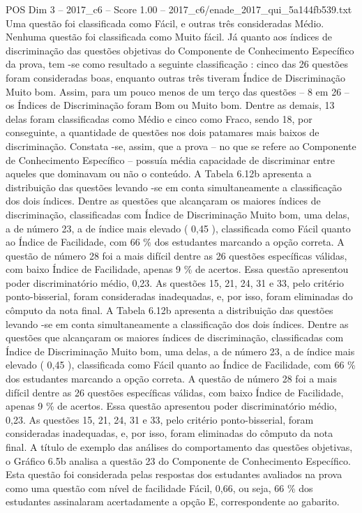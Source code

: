 \begin{textsample}{POS Dim 3 – 2017\_c6 – Score 1.00 – 2017\_c6/enade\_2017\_qui\_5a144fb539.txt}
Uma questão foi classificada como Fácil, e outras três consideradas Médio.
Nenhuma questão foi classificada como Muito fácil.
Já quanto aos índices de discriminação das questões objetivas do Componente de Conhecimento Específico da prova, tem -se como resultado a seguinte classificação : cinco das 26 questões foram consideradas boas, enquanto outras três tiveram Índice de Discriminação Muito bom.
Assim, para um pouco menos de um terço das questões – 8 em 26 – os Índices de Discriminação foram Bom ou Muito bom.
Dentre as demais, 13 delas foram classificadas como Médio e cinco como Fraco, sendo 18, por conseguinte, a quantidade de questões nos dois patamares mais baixos de discriminação.
Constata -se, assim, que a prova – no que se refere ao Componente de Conhecimento Específico – possuía média capacidade de discriminar entre aqueles que dominavam ou não o conteúdo.
A Tabela 6.12b apresenta a distribuição das questões levando -se em conta simultaneamente a classificação dos dois índices.
Dentre as questões que alcançaram os maiores índices de discriminação, classificadas com Índice de Discriminação Muito bom, uma delas, a de número 23, a de índice mais elevado ( 0,45 ), classificada como Fácil quanto ao Índice de Facilidade, com 66 \% dos estudantes marcando a opção correta.
A questão de número 28 foi a mais difícil dentre as 26 questões específicas válidas, com baixo Índice de Facilidade, apenas 9 \% de acertos.
Essa questão apresentou poder discriminatório médio, 0,23.
As questões 15, 21, 24, 31 e 33, pelo critério ponto-bisserial, foram consideradas inadequadas, e, por isso, foram eliminadas do cômputo da nota final.
A Tabela 6.12b apresenta a distribuição das questões levando -se em conta simultaneamente a classificação dos dois índices.
Dentre as questões que alcançaram os maiores índices de discriminação, classificadas com Índice de Discriminação Muito bom, uma delas, a de número 23, a de índice mais elevado ( 0,45 ), classificada como Fácil quanto ao Índice de Facilidade, com 66 \% dos estudantes marcando a opção correta.
A questão de número 28 foi a mais difícil dentre as 26 questões específicas válidas, com baixo Índice de Facilidade, apenas 9 \% de acertos.
Essa questão apresentou poder discriminatório médio, 0,23.
As questões 15, 21, 24, 31 e 33, pelo critério ponto-bisserial, foram consideradas inadequadas, e, por isso, foram eliminadas do cômputo da nota final.
A título de exemplo das análises do comportamento das questões objetivas, o Gráfico 6.5b analisa a questão 23 do Componente de Conhecimento Específico.
Esta questão foi considerada pelas respostas dos estudantes avaliados na prova como uma questão com nível de facilidade Fácil, 0,66, ou seja, 66 \% dos estudantes assinalaram acertadamente a opção E, correspondente ao gabarito.

\end{textsample}
